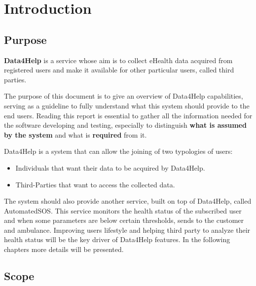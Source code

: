 
\chapter{Introduction}
\section{Purpose}

\textbf{Data4Help} is a service whose aim is to collect eHealth data acquired from registered users and make it available for other particular users, called third parties.

\par \noindent \newline
The purpose of this document is to give an overview of Data4Help capabilities, serving as a guideline to fully understand what this system should provide to the end users. Reading this report
is essential to gather all the information needed for the software developing and testing, especially to distinguish  \textbf{what is assumed by the system} and what is \textbf{required} from it.

\par \noindent \newline
Data4Help is a system that can allow the joining of two typologies of users:
\begin{itemize}
\item Individuals that want their data to be acquired by Data4Help.
\item Third-Parties that want to access the collected data.
\end{itemize}
The system should also provide another service, built on top of Data4Help, called AutomatedSOS.
\newline
 This service monitors the health status of the subscribed user and when some parameters are below certain thresholds, sends to the customer and ambulance.
\newline
Improving users lifestyle and helping third party to analyze their health status will be the key driver of Data4Help features.
\newline
In the following chapters more details will be presented.


\section{Scope}
